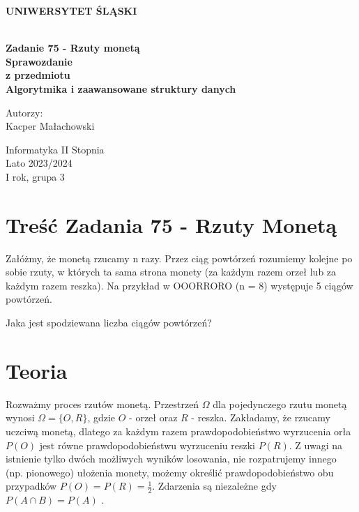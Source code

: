 \documentclass[12pt,oneside,a4paper]{book} %
\theoremstyle{break}
\begin{document}
\thispagestyle{empty}
\begin{center}
  \Large
  \bf{UNIWERSYTET ŚLĄSKI}\\
  \bf{}\\[25mm]
  \large

  \bf{Zadanie 75 - Rzuty monetą}\\[35mm]

  Sprawozdanie\\
  z przedmiotu\\
  Algorytmika i zaawansowane struktury danych\\[25mm]
\end{center}
\begin{flushright}
  \large
  Autorzy:\\
  Kacper Małachowski\\
\end{flushright}
\vspace*{\fill}
\begin{center}
  Informatyka II Stopnia\\
  Lato 2023/2024\\
  I rok, grupa 3\\[25mm]
\end{center}

\chapter*{Treść Zadania 75 - Rzuty Monetą}

Załóżmy, że monetą rzucamy n razy. Przez ciąg powtórzeń rozumiemy kolejne po sobie rzuty, w których ta sama strona monety (za każdym razem orzeł lub za każdym razem reszka). Na przykład w OOORRORO (n = 8) występuje 5 ciągów powtórzeń.

Jaka jest spodziewana liczba ciągów powtórzeń?

\chapter*{Teoria}

Rozważmy proces rzutów monetą. Przestrzeń $\Omega$ dla pojedynczego rzutu monetą wynosi $\Omega=\{O, R\}$, gdzie $O$ - orzeł oraz $R$ - reszka. Zakładamy, że rzucamy uczciwą monetą, dlatego za każdym razem prawdopodobieństwo wyrzucenia orła $P(O)$ jest równe prawdopodobieństwu wyrzuceniu reszki $P(R)$. Z uwagi na istnienie tylko dwóch możliwych wyników losowania, nie rozpatrujemy innego (np. pionowego) ułożenia monety, możemy określić prawdopodobieństwo obu przypadków $P(O)=P(R)=\frac{1}{2}$.
Zdarzenia są niezależne gdy $P(A \cap B) = P(A)$ \cite{MetProb}.
\end{document}
